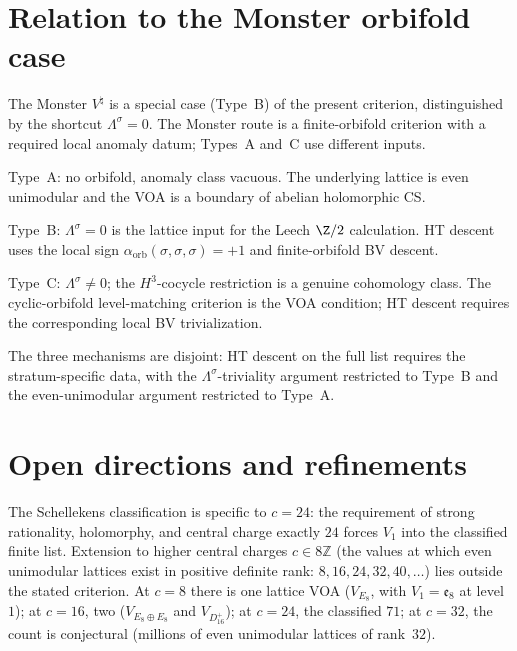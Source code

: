 \section{Relation to the Monster orbifold case}
\label{sec:schellekens-71-vs-monster}

The Monster $V^\natural$ is a special case (Type~B) of the present
criterion, distinguished by the shortcut
$\Lambda^\sigma = 0$. The Monster route is a finite-orbifold
criterion with a required local anomaly datum; Types~A and~C use
different inputs.

\begin{remark}
\label{rem:schellekens-three-mechanisms}
Type~A: no orbifold, anomaly class vacuous. The underlying lattice is
even unimodular and the VOA is a boundary of abelian holomorphic CS.

Type~B: $\Lambda^\sigma = 0$ is the lattice input for the Leech
$\Z/2$ calculation. HT descent uses the local sign
$\alpha_{\mathrm{orb}}(\sigma,\sigma,\sigma)=+1$ and finite-orbifold
BV descent.

Type~C: $\Lambda^\sigma \ne 0$; the $H^3$-cocycle restriction is a
genuine cohomology class. The cyclic-orbifold level-matching criterion
is the VOA condition; HT descent requires the corresponding local
BV trivialization.

The three mechanisms are disjoint: HT descent on the full list requires
the stratum-specific data, with the
$\Lambda^\sigma$-triviality argument restricted to Type~B and the
even-unimodular argument restricted to Type~A.
\end{remark}

\section{Open directions and refinements}
\label{sec:schellekens-71-open-directions}

\begin{remark}[Beyond $c = 24$: arithmetic constraint]
\label{rem:schellekens-beyond-c24}
The Schellekens classification is specific to $c = 24$: the
requirement of strong rationality, holomorphy, and central charge exactly
$24$ forces $V_1$ into the classified finite list. Extension to
higher central charges $c \in 8\mathbb{Z}$ (the values at which even
unimodular lattices exist in positive definite rank:
$8, 16, 24, 32, 40, \ldots$) lies outside the stated criterion.
At $c = 8$ there is one lattice VOA ($V_{E_8}$, with
$V_1 = \mathfrak{e}_8$ at level~$1$); at $c = 16$, two
($V_{E_8 \oplus E_8}$ and $V_{D_{16}^+}$); at $c = 24$, the classified
$71$; at $c = 32$, the count is conjectural (millions of even
unimodular lattices of rank~$32$).
\end{remark}

